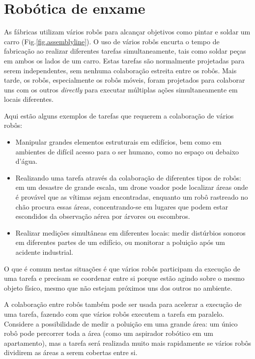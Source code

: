 
\chapter{Robótica de enxame}\label{ch.swarm}

As fábricas utilizam vários robôs para alcançar objetivos como pintar e soldar um carro (Fig.\ref{fig.assemblyline}). O uso de vários robôs encurta o tempo de fabricação ao realizar diferentes tarefas simultaneamente, tais como soldar peças em ambos os lados de um carro. Estas tarefas são normalmente projetadas para serem independentes, sem nenhuma colaboração estreita entre os robôs. Mais tarde, os robôs, especialmente os robôs móveis, foram projetados para colaborar uns com os outros \emph{directly} para executar múltiplas ações simultaneamente em locais diferentes.

Aqui estão alguns exemplos de tarefas que requerem a colaboração de vários robôs:
\begin{itemize}
\item Manipular grandes elementos estruturais em edifícios, bem como em ambientes de difícil acesso para o ser humano, como no espaço ou debaixo d'água.
\item Realizando uma tarefa através da colaboração de diferentes tipos de robôs: em um desastre de grande escala, um drone voador pode localizar áreas onde é provável que as vítimas sejam encontradas, enquanto um robô rastreado no chão procura essas áreas, concentrando-se em lugares que podem estar escondidos da observação aérea por árvores ou escombros.
\item Realizar medições simultâneas em diferentes locais: medir distúrbios sonoros em diferentes partes de um edifício, ou monitorar a poluição após um acidente industrial. 
\end{itemize}
O que é comum nestas situações é que vários robôs participam da execução de uma tarefa e precisam se coordenar entre si porque estão agindo sobre o mesmo objeto físico, mesmo que não estejam próximos uns dos outros no ambiente. 

A colaboração entre robôs também pode ser usada para acelerar a execução de uma tarefa, fazendo com que vários robôs executem a tarefa em paralelo. Considere a possibilidade de medir a poluição em uma grande área: um único robô pode percorrer toda a área (como um aspirador robótico em um apartamento), mas a tarefa será realizada muito mais rapidamente se vários robôs dividirem as áreas a serem cobertas entre si.

